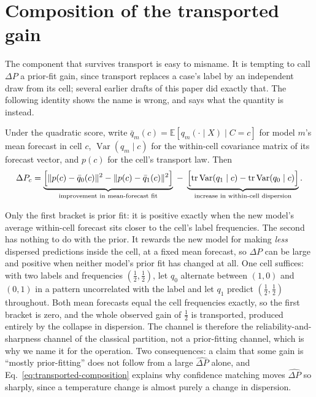 \section{Composition of the transported gain}\label{app:transported}

The component that survives transport is easy to misname. It is tempting to call
$\Delta P$ a prior-fit gain, since transport replaces a case's label by an independent
draw from its cell; several earlier drafts of this paper did exactly that. The following
identity shows the name is wrong, and says what the quantity is instead.

\begin{proposition}\label{prop:transported}
Under the quadratic score, write $\bar q_m(c)=\mathbb E[q_m(\cdot\mid X)\mid C=c]$ for
model $m$'s mean forecast in cell $c$, $\operatorname{Var}(q_m\mid c)$ for the
within-cell covariance matrix of its forecast vector, and $p(c)$ for the cell's transport
law. Then
\begin{equation}
\Delta P_c=
\underbrace{\Bigl[\lVert p(c)-\bar q_0(c)\rVert^2-\lVert p(c)-\bar q_1(c)\rVert^2\Bigr]}
_{\text{improvement in mean-forecast fit}}
\;-\;
\underbrace{\Bigl[\operatorname{tr}\operatorname{Var}(q_1\mid c)-
\operatorname{tr}\operatorname{Var}(q_0\mid c)\Bigr]}_{\text{increase in within-cell dispersion}} .
\label{eq:transported-composition}
\end{equation}
\end{proposition}

Only the first bracket is prior fit: it is positive exactly when the new model's average
within-cell forecast sits closer to the cell's label frequencies. The second has nothing to
do with the prior. It rewards the new model for making \emph{less} dispersed predictions
inside the cell, at a fixed mean forecast, so $\Delta P$ can be large and positive when
neither model's prior fit has changed at all. One cell suffices: with two labels and
frequencies $(\tfrac12,\tfrac12)$, let $q_0$ alternate between $(1,0)$ and $(0,1)$ in a
pattern uncorrelated with the label and let $q_1$ predict $(\tfrac12,\tfrac12)$ throughout.
Both mean forecasts equal the cell frequencies exactly, so the first bracket is zero, and the
whole observed gain of $\tfrac12$ is transported, produced entirely by the collapse in
dispersion. The channel is therefore the reliability-and-sharpness channel of the classical
partition, not a prior-fitting channel, which is why we name it for the operation. Two
consequences: a claim that some gain is ``mostly prior-fitting'' does not follow from a large
$\widehat{\Delta P}$ alone, and Eq.~\eqref{eq:transported-composition} explains why
confidence matching moves $\widehat{\Delta P}$ so sharply, since a temperature change is
almost purely a change in dispersion.


